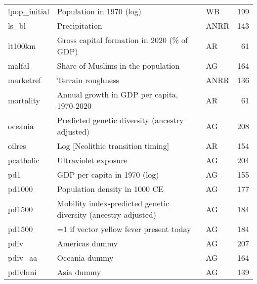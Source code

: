 \begin{tabular}{lllr}
lpop\_initial                   &                                                  Population in 1970 (log) &     WB &   199 \\
ls\_bl                          &                                                             Precipitation &   ANRR &   143 \\
lt100km                        &                                Gross capital formation in 2020 (\% of GDP) &     AR &    61 \\
malfal                         &                                        Share of Muslims in the population &     AG &   164 \\
marketref                      &                                                         Terrain roughness &   ANRR &   136 \\
mortality                      &                                Annual growth in GDP per capita, 1970-2020 &     AR &    61 \\
oceania                        &                           Predicted genetic diversity (ancestry adjusted) &     AG &   208 \\
oilres                         &                                         Log [Neolithic transition timing] &     AR &   154 \\
pcatholic                      &                                                      Ultraviolet exposure &     AG &   204 \\
pd1                            &                                              GDP per capita in 1970 (log) &     AG &   155 \\
pd1000                         &                                             Population density in 1000 CE &     AG &   177 \\
pd1500                         &            Mobility index-predicted genetic diversity (ancestry adjusted) &     AG &   184 \\
pd1500                         &                                   =1 if vector yellow fever present today &     AG &   184 \\
pdiv                           &                                                            Americas dummy &     AG &   207 \\
pdiv\_aa                        &                                                             Oceania dummy &     AG &   164 \\
pdivhmi                        &                                                                Asia dummy &     AG &   139 \\

\end{tabular}

